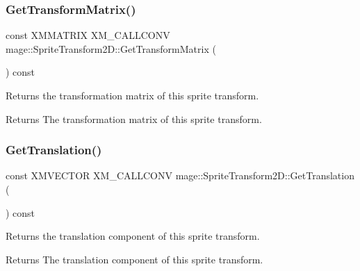 \subsubsection{\texorpdfstring{Get\+Transform\+Matrix()}{GetTransformMatrix()}}
{\footnotesize\ttfamily const X\+M\+M\+A\+T\+R\+IX X\+M\+\_\+\+C\+A\+L\+L\+C\+O\+NV mage\+::\+Sprite\+Transform2\+D\+::\+Get\+Transform\+Matrix (\begin{DoxyParamCaption}{ }\end{DoxyParamCaption}) const\hspace{0.3cm}{\ttfamily [noexcept]}}

Returns the transformation matrix of this sprite transform.

\begin{DoxyReturn}{Returns}
The transformation matrix of this sprite transform. 
\end{DoxyReturn}
\mbox{\label{classmage_1_1_sprite_transform2_d_a2e78cd56fffdb096967c7bf78636dab2}} 
\subsubsection{\texorpdfstring{Get\+Translation()}{GetTranslation()}}
{\footnotesize\ttfamily const X\+M\+V\+E\+C\+T\+OR X\+M\+\_\+\+C\+A\+L\+L\+C\+O\+NV mage\+::\+Sprite\+Transform2\+D\+::\+Get\+Translation (\begin{DoxyParamCaption}{ }\end{DoxyParamCaption}) const\hspace{0.3cm}{\ttfamily [noexcept]}}

Returns the translation component of this sprite transform.

\begin{DoxyReturn}{Returns}
The translation component of this sprite transform. 
\end{DoxyReturn}
\mbox{\label{classmage_1_1_sprite_transform2_d_a6c881a0a0b3f6fd7e25708a29e02aa6f}} 
